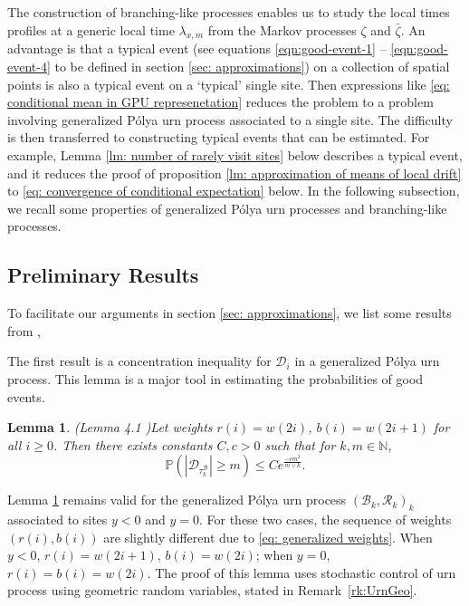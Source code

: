 \documentclass[twoside,12pt, a4paper, final]{article}
\newtheorem{lemma}{Lemma}[section]
\numberwithin{equation}{section}
\theoremstyle{remark}
\newcommand{\abs}[1]{\left\vert #1 \right\vert}
\begin{document}
	The construction of branching-like processes enables us to study the local times profiles at a generic local time $\lambda_{x,m}$ from the Markov processes $\zeta$ and $\bar{\zeta}$. An advantage is that a typical event ({see equations \eqref{eqn:good-event-1} -- \eqref{eqn:good-event-4} to be defined in section \ref{sec: approximations}}) on a collection of spatial points is also a typical event on a `typical' single site. Then expressions like \eqref{eq: conditional mean in GPU represenetation} reduces the problem to a problem involving generalized P\'{o}lya urn process associated to a single site. The difficulty is then transferred to constructing typical events that can be estimated. For example, Lemma \ref{lm: number of rarely visit sites} below describes a typical event, and it reduces the proof of proposition \ref{lm: approximation of means of local drift} to \eqref{eq: convergence of conditional expectation} below. In the following subsection, we recall some properties of generalized P\'{o}lya urn processes and branching-like processes.
	
	\subsection{Preliminary Results}
	To facilitate our arguments in section \ref{sec: approximations}, we list some results from \cite{KMP23,T96}, 
	
	The first result is a concentration inequality for $\mathcal{D}_i$ in a generalized P\'{o}lya urn process. This lemma is a major tool in estimating the probabilities of good events.
	\begin{lemma}(Lemma 4.1 \cite{KMP23})\label{lm: concentration inequality}
		Let weights $r(i) = w(2i)$, $b(i)= w(2i+1) $ for all $i\geq 0$. Then there exists constants $C,c>0$ such that for $k, m \in \mathbb{N}$,
		$$
		\mathbb{P}\left(  \abs{ \mathcal{D}_{\tau_k^{\mathcal{B}}}   } \geq m \right) \leq C e^{\frac{-cm^2}{m \vee k}}.
		$$
	\end{lemma} 
	Lemma \ref{lm: concentration inequality} remains valid for the generalized P\'{o}lya urn process $(\mathcal{B}_{k},\mathcal{R}_{k})_k$ associated to sites $y<0$ and $y=0$. For these two cases, the sequence of weights $(r(i),b(i))$ are slightly different due to \eqref{eq: generalized weights}. When $y<0$, $r(i) = w(2i+1)$, $b(i)= w(2i) $; when $y=0$, $r(i) = b(i)=w(2i)$. The proof of this lemma uses stochastic control of urn process using geometric random variables, stated in Remark~\ref{rk:UrnGeo}.
	
\end{document}
